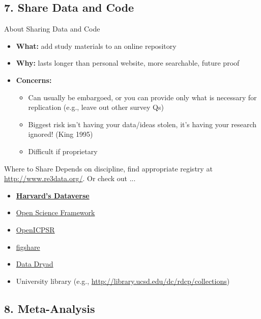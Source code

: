 \documentclass[12pt, compress]{beamer} %
\let\noteitem\item %
\renewcommand{\item}{ 
	\noteitem\vspace{\fill}
	}
\begin{document}
		
\subsection{7. Share Data and Code}

	\begin{frame}{About Sharing Data and Code}
		\begin{itemize}
			\item \textbf{What:} add study materials to an online repository
			\item \textbf{Why:} lasts longer than personal website, more searchable, future proof
			\item \textbf{Concerns:} 
				\begin{itemize}
					\item Can usually be embargoed, or you can provide only what is necessary for replication (e.g., leave out other survey Qs)
					\item Biggest risk isn't having your data/ideas stolen, it's having your research ignored! (King 1995)
					\item Difficult if proprietary
				\end{itemize}
		\end{itemize}
	\end{frame}
	
	\begin{frame}{Where to Share}
		Depends on discipline, find appropriate registry at \url{http://www.re3data.org/}. Or check out ... 
		\begin{itemize}
			\item \textbf{\href{https://dataverse.harvard.edu/}{Harvard’s Dataverse} }
			\item \href{https://osf.io/}{Open Science Framework}
			\item \href{https://www.openicpsr.org/openicpsr/}{OpenICPSR}
			\item \href{https://figshare.com/}{figshare}
			\item \href{http://datadryad.org/}{Data Dryad}
			\item University library (e.g., \url{http://library.ucsd.edu/dc/rdcp/collections})
		\end{itemize}		
	\end{frame}


\subsection{8. Meta-Analysis}
	
\end{document}

